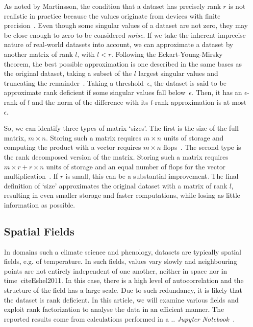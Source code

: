 \documentclass{acm_proc_article-sp}
\begin{document}
As noted by Martinsson, the condition that a dataset has precisely rank $r$ is not realistic in practice because the values originate from devices with finite precision~\cite{Martinsson2016}. Even though some singular values of a dataset are not zero, they may be close enough to zero to be considered \textit{noise}. If we take the inherent imprecise nature of real-world datasets into account, we can approximate a dataset by another matrix of rank $l$, with $l < r$. Following the Eckart-Young-Mirsky theorem, the best possible approximation is one described in the same bases as the original dataset, taking a subset of the $l$ largest singular values and truncating the remainder~\cite{Eckart1936}. Taking a threshold~$\epsilon$, the dataset is said to be approximate rank deficient if some singular values fall below~$\epsilon$. Then, it has an $\epsilon$-rank of $l$ and the norm of the difference with its $l$-rank approximation is at most~$\epsilon$.

So, we can identify three types of matrix `sizes'. The first is the size of the full matrix, $m \times n$. Storing such a matrix requires $m \times n$ units of storage and computing the product with a vector requires $m \times n$ flops~\cite{Martinsson2016}. The second type is the rank decomposed version of the matrix. Storing such a matrix requires $m \times r + r \times n$ units of storage and an equal number of flops for the vector multiplication~\cite{Martinsson2016}. If $r$ is small, this can be a substantial improvement. The final definition of `size' approximates the original dataset with a matrix of rank $l$, resulting in even smaller storage and faster computations, while losing as little information as possible.

\subsection{Spatial Fields}
\label{sec:Introduction Spatial Fields}

In domains such a climate science and phenology, datasets are typically spatial fields, e.g. of temperature. In such fields, values vary slowly and neighbouring points are not entirely independent of one another, neither in space nor in time~cite{Eshel2011}. In this case, there is a high level of autocorrelation and the structure of the field has a large scale. Due to such redundancy, it is likely that the dataset is rank deficient. In this article, we will examine various fields and exploit rank factorization to analyse the data in an efficient manner. The reported results come from calculations performed in a .. \textit{Jupyter Notebook}~\cite{RefNeeded}.
\end{document}
